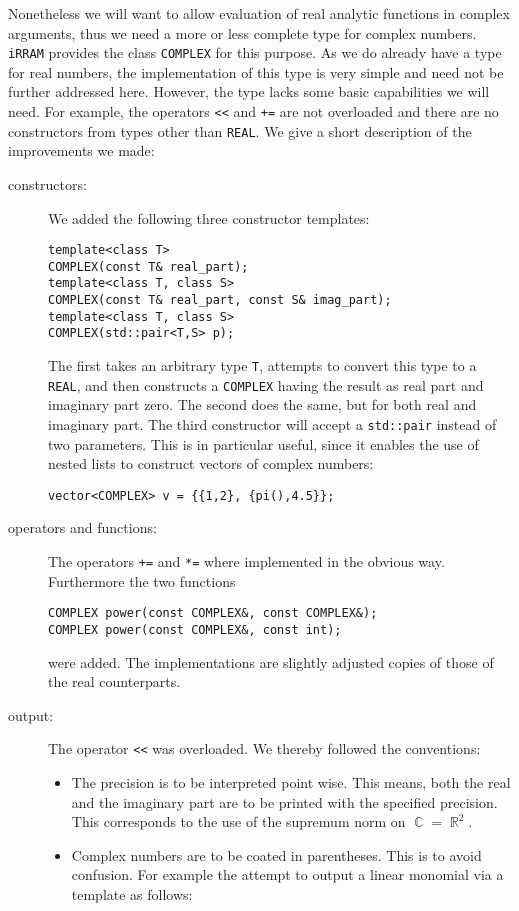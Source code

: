 \documentclass{article}
\DeclareMathOperator{\RR}{\ensuremath{\mathbb{R}}\xspace}
\DeclareMathOperator{\CC}{\ensuremath{\mathbb{C}}\xspace}
\newcommand{\irram}{\texttt{iRRAM}\xspace}
\newcommand{\ir}[1]{\texttt{#1}}
\newcommand{\code}[1]{\texttt{#1}}
\begin{document}
Nonetheless we will want to allow evaluation of real analytic functions in complex arguments, thus we need a more or less complete type for complex numbers. \irram provides the class \ir{COMPLEX} for this purpose. As we do already have a type for real numbers, the implementation of this type is very simple and need not be further addressed here. However, the type lacks some basic capabilities we will need. For example, the operators \ir{<<} and \code{+=} are not overloaded and there are no constructors from types other than \ir{REAL}. We give a short description of the improvements we made:
\begin{description}
\item[constructors:] We added the following three constructor templates:
\begin{lstlisting}
template<class T>
COMPLEX(const T& real_part);
template<class T, class S>
COMPLEX(const T& real_part, const S& imag_part);
template<class T, class S>
COMPLEX(std::pair<T,S> p);
\end{lstlisting}
The first takes an arbitrary type \code{T}, attempts to convert this type to a \ir{REAL}, and then constructs a \ir{COMPLEX} having the result as real part and imaginary part zero. The second does the same, but for both real and imaginary part. The third constructor will accept a \code{std::pair} instead of two parameters. This is in particular useful, since it enables the use of nested lists to construct vectors of complex numbers:
\begin{lstlisting}
vector<COMPLEX> v = {{1,2}, {pi(),4.5}};
\end{lstlisting}
\item[operators and functions:] The operators \code{+=} and \code{*=} where implemented in the obvious way. Furthermore the two functions
\begin{lstlisting}
COMPLEX power(const COMPLEX&, const COMPLEX&);
COMPLEX power(const COMPLEX&, const int);
\end{lstlisting}
were added. The implementations are slightly adjusted copies of those of the real counterparts.
\item[output:] The operator \ir{<<} was overloaded. We thereby followed the conventions:
\begin{itemize}
\item The precision is to be interpreted point wise. This means, both the real and the imaginary part are to be printed with the specified precision. This corresponds to the use of the supremum norm on $\CC = \RR^2$.
\item Complex numbers are to be coated in parentheses. This is to avoid confusion. For example the attempt to output a linear monomial via a template as follows:

\end{itemize}
\end{description}
\end{document}

